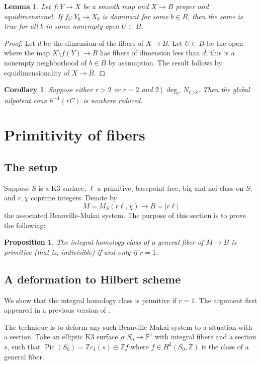\documentclass{amsart}
\theoremstyle{plain}
\newtheorem{lemma}[theorem]{Lemma}
\newtheorem{proposition}[theorem]{Proposition}
\newtheorem{corollary}[theorem]{Corollary}
\theoremstyle{definition}
\theoremstyle{remark}
\begin{document}
\begin{lemma}
    Let $f:Y\rightarrow X$ be a smooth map and $X\to B$ proper and equidimensional.
    If $f_b:Y_b\rightarrow X_b$ is dominant for some $b\in B$, then the same is true for all $b$ in some nonempty open $U\subset B$.
\end{lemma}

\begin{proof}
    Let $d$ be the dimension of the fibers of $X\rightarrow B$.
    Let $U\subset B$ be the open where the map $X\setminus f(Y)\rightarrow B$ has fibers of dimension less than $d$; this is a nonempty neighborhood of $b\in B$ by assumption. The result follows by equidimensionality of $X\rightarrow B$. 
\end{proof}

\begin{corollary}
    Suppose either $r>2$ or $r=2$ and $2\mid \deg_CN_{C/S}$.
    Then the global nilpotent cone $h^{-1}(rC)$ is nowhere reduced.
\end{corollary}


\section{Primitivity of fibers}
\subsection{The setup}
Suppose $S$ is a K3 surface, $\ell$ a primitive, basepoint-free, big and nef class on $S$, and $r,\chi$ coprime integers.
Denote by
\[M=M_S(r\ell,\chi)\to B=|r\ell|\]
the associated Beauville-Mukai system.
The purpose of this section is to prove the following:
\begin{proposition}\label{prop:primfibers}
    The integral homology class of a general fiber of $M\to B$ is primitive (that is, indivisible) if and only if $r=1$.
\end{proposition}
\subsection{A deformation to Hilbert scheme}
We show that the integral homology class is primitive if $r=1$.
The argument first appeared in a previous version of \cite{bai2026}.

The technique is to deform any such Beauville-Mukai system to a situation with a section.
Take an elliptic K3 surface $\rho:S_0\to\mathbb P^1$ with integral fibers and a section $s$, such that $\operatorname{Pic}(S_0)=\mathbb Zc_1(s)\oplus\mathbb Zf$ where $f\in H^2(S_0,\mathbb Z)$ is the class of a general fiber.
\end{document}
